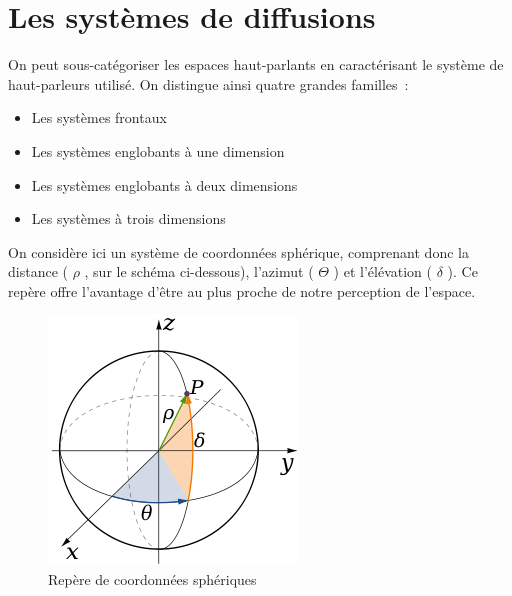 \documentclass[
  letterpaper,
  DIV=11,
  numbers=noendperiod]{scrreprt}
\providecommand{\tightlist}{%
  \setlength{\itemsep}{0pt}\setlength{\parskip}{0pt}}\usepackage{longtable,booktabs,array}
\begin{document}
\hypertarget{les-systuxe8mes-de-diffusions}{%
\section{Les systèmes de
diffusions}\label{les-systuxe8mes-de-diffusions}}

On peut sous-catégoriser les espaces haut-parlants en caractérisant le
système de haut-parleurs utilisé. On distingue ainsi quatre grandes
familles~:

\begin{itemize}
\tightlist
\item
  Les systèmes frontaux
\item
  Les systèmes englobants à une dimension
\item
  Les systèmes englobants à deux dimensions
\item
  Les systèmes à trois dimensions
\end{itemize}

\begin{tcolorbox}[enhanced jigsaw, leftrule=.75mm, arc=.35mm, bottomtitle=1mm, colback=white, colbacktitle=quarto-callout-important-color!10!white, opacityback=0, left=2mm, rightrule=.15mm, opacitybacktitle=0.6, breakable, toptitle=1mm, titlerule=0mm, bottomrule=.15mm, toprule=.15mm, coltitle=black, title=\textcolor{quarto-callout-important-color}{\faExclamation}\hspace{0.5em}{Important}]

On considère ici un système de coordonnées sphérique, comprenant donc la
distance ( \(\rho\) , sur le schéma ci-dessous), l'azimut ( \(\Theta\) )
et l'élévation ( \(\delta\) ). Ce repère offre l'avantage d'être au plus
proche de notre perception de l'espace.

\begin{figure}[H]

{\centering \includegraphics{spatialisation/../_resources/bitmap/math/Spherical-Coordinates--28Latitude-2C-Longitude-29.png}

}

\caption{\label{fig-sphere}Repère de coordonnées sphériques}

\end{figure}

\end{tcolorbox}
\end{document}
